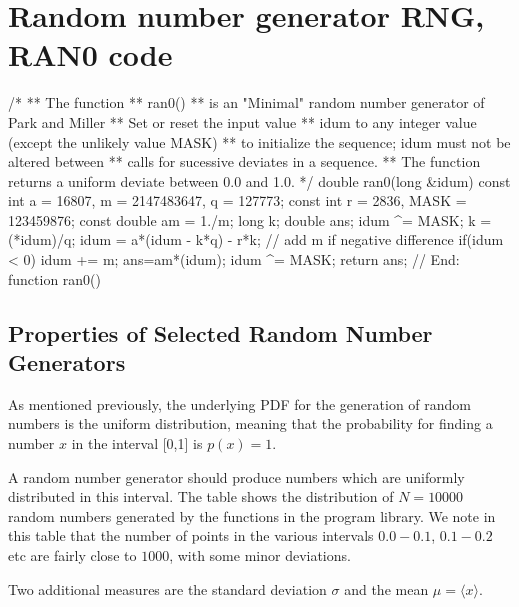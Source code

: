 \documentclass[%
oneside,                 %
final,                   %
10pt]{article}
\newenvironment{block_mdfboxadmon}[1][]{
\begin{block_mdfboxmdframed}[frametitle=#1]
}
{
\end{block_mdfboxmdframed}
}
\begin{document}
\section{Random number generator RNG, RAN0 code}

\begin{block_mdfboxadmon}[]

\bcppcod
    /*
     ** The function
     **           ran0()
     ** is an "Minimal" random number generator of Park and Miller
     ** Set or reset the input value
     ** idum to any integer value (except the unlikely value MASK)
     ** to initialize the sequence; idum must not be altered between
     ** calls for sucessive deviates in a sequence.
     ** The function returns a uniform deviate between 0.0 and 1.0.
     */
double ran0(long &idum)
{
   const int a = 16807, m = 2147483647, q = 127773;
   const int r = 2836, MASK = 123459876;
   const double am = 1./m;
   long     k;
   double   ans;
   idum ^= MASK;
   k = (*idum)/q;
   idum = a*(idum - k*q) - r*k;
   // add m if negative difference
   if(idum < 0) idum += m;
   ans=am*(idum);
   idum ^= MASK;
   return ans;
} // End: function ran0() 
\ecppcod
\end{block_mdfboxadmon} %



\subsection{Properties of Selected Random Number Generators}

\begin{block_mdfboxadmon}[]

As mentioned previously, the underlying PDF for the generation of
random numbers is the uniform distribution, meaning that the 
probability for finding a number $x$ in the interval [0,1] is $p(x)=1$.

A random number generator should produce numbers which are uniformly distributed
in this interval. The table  shows the distribution of $N=10000$ random
numbers generated by the functions in the program library.
We note in this table that the number of points in the various
intervals $0.0-0.1$, $0.1-0.2$ etc are fairly close to $1000$, with some minor
deviations. 

Two additional measures are the standard deviation $\sigma$ and the mean
$\mu=\langle x\rangle$.
\end{block_mdfboxadmon} %
\end{document}
